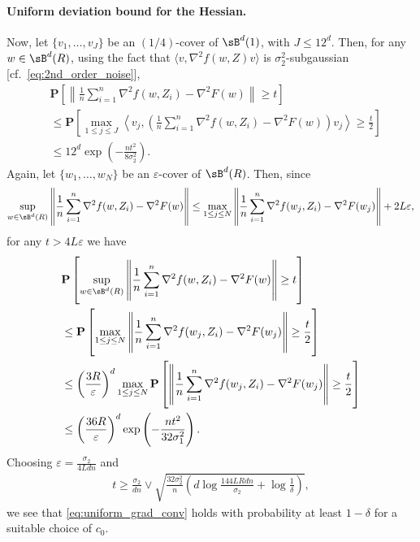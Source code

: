 \documentclass[final,12pt]{colt2018}
\numberwithin{equation}{section}
\numberwithin{equation}{section}
\def\PP{\mathbf{P}}
\def\ave#1{\langle #1 \rangle}
\def\eps{\varepsilon}
\begin{document}
\paragraph{Uniform deviation bound for the Hessian.} Now, let $\{v_1,\ldots,v_J\}$ be an $(1/4)$-cover of $\sB^d(1)$, with $J \le 12^d$. Then, for any $w \in \sB^d(R)$, using the fact that $\ave{v,\nabla^2 f(w,Z)v}$ is $\sigma^2_2$-subgaussian [cf.~\eqref{eq:2nd_order_noise}],
\begin{align*}
&	\PP\left[\left\| \frac{1}{n}\sum^n_{i=1}\nabla^2 f(w,Z_i) - \nabla^2 F(w)\right\| \ge t \right] \\
& \le \PP\left[ \max_{1 \le j \le J} \left\langle v_j, \left(\frac{1}{n}\sum^n_{i=1}\nabla^2 f(w,Z_i)-\nabla^2 F(w)\right)v_j\right\rangle \ge \frac{t}{2}\right] \\
& \le 12^d \exp\left(-\frac{nt^2}{8\sigma^2_2}\right).
\end{align*}
Again, let $\{w_1,\ldots,w_N\}$ be an $\eps$-cover of $\sB^d(R)$. Then, since
\begin{align*}
	\sup_{w \in \sB^d(R)}\left\| \frac{1}{n}\sum^n_{i=1}\nabla^2 f(w,Z_i) - \nabla^2 F(w)\right\| \le \max_{1 \le j \le N} \left\|\frac{1}{n}\sum^n_{i=1}\nabla^2 f(w_j,Z_i) - \nabla^2 F(w_j)\right\| + 2L\eps,
\end{align*}
for any $t > 4L\eps$ we have
\begin{align*}
&	\PP\left[ \sup_{w \in \sB^d(R)}\left\| \frac{1}{n}\sum^n_{i=1}\nabla^2 f(w,Z_i) - \nabla^2 F(w)\right\| \ge t \right] \\
&\le \PP\left[ \max_{1 \le j \le N}\left\| \frac{1}{n}\sum^n_{i=1}\nabla^2 f(w_j,Z_i) - \nabla^2 F(w_j)\right\| \ge \frac{t}{2} \right]  \\
&\le \left(\frac{3R}{\eps}\right)^d \max_{1 \le j \le N} \PP\left[\left\| \frac{1}{n}\sum^n_{i=1}\nabla^2 f(w_j,Z_i) - \nabla^2 F(w_j)\right\| \ge \frac{t}{2} \right] \\
&\le \left(\frac{36R}{\eps}\right)^d \exp\left(-\frac{nt^2}{32\sigma^2_1}\right).
\end{align*}
Choosing $\eps = \frac{\sigma_2}{4Ldn}$ and
\begin{align*}
	t \ge \frac{\sigma_2}{dn} \vee \sqrt{\frac{32\sigma^2_2}{n}\left(d \log \frac{144LRdn}{\sigma_2}+\log\frac{1}{\delta}\right)},
\end{align*}
we see that \eqref{eq:uniform_grad_conv} holds with probability at least $1-\delta$ for a suitable choice of $c_0$.




  
	

   
\end{document}

